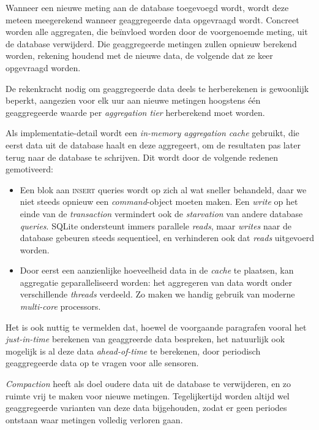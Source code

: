 \documentclass[12pt,draft,parskip=full]{article}
\begin{document}
Wanneer een nieuwe meting aan de database toegevoegd wordt, wordt deze meteen meegerekend wanneer geaggregeerde data opgevraagd wordt. Concreet worden alle aggregaten, die be\"invloed worden door de voorgenoemde meting, uit de database verwijderd. Die geaggregeerde metingen zullen opnieuw berekend worden, rekening houdend met de nieuwe data, de volgende dat ze keer opgevraagd worden. 

De rekenkracht nodig om geaggregeerde data deels te herberekenen is gewoonlijk beperkt, aangezien voor elk uur aan nieuwe metingen hoogstens \'e\'en geaggregeerde waarde per \emph{aggregation tier} herberekend moet worden.

Als implementatie-detail wordt een \emph{in-memory aggregation cache} gebruikt, die eerst data uit de database haalt en deze aggregeert, om de resultaten pas later terug naar de database te schrijven. Dit wordt door de volgende redenen gemotiveerd:

\begin{itemize}
	\item Een blok aan \textsc{insert} queries wordt op zich al wat sneller behandeld, daar we niet steeds opnieuw een \emph{command}-object moeten maken. Een \emph{write} op het einde van de \emph{transaction} vermindert ook de \emph{starvation} van andere database \emph{queries}. SQLite ondersteunt immers parallele \emph{reads}, maar \emph{writes} naar de database gebeuren steeds sequentieel, en verhinderen ook dat \emph{reads} uitgevoerd worden. 
	
	\item Door eerst een aanzienlijke hoeveelheid data in de \emph{cache} te plaatsen, kan aggregatie geparalleliseerd worden: het aggregeren van data wordt onder verschillende \emph{threads} verdeeld. Zo maken we handig gebruik van moderne \emph{multi-core} processors.
\end{itemize}

Het is ook nuttig te vermelden dat, hoewel de voorgaande paragrafen vooral het \emph{just-in-time} berekenen van geaggreerde data bespreken, het natuurlijk ook mogelijk is al deze data \emph{ahead-of-time} te berekenen, door periodisch geaggregeerde data op te vragen voor alle sensoren.

\emph{Compaction} heeft als doel oudere data uit de database te verwijderen, en zo ruimte vrij te maken voor nieuwe metingen. Tegelijkertijd worden altijd wel geaggregeerde varianten van deze data bijgehouden, zodat er geen periodes ontstaan waar metingen volledig verloren gaan. 
\end{document}
